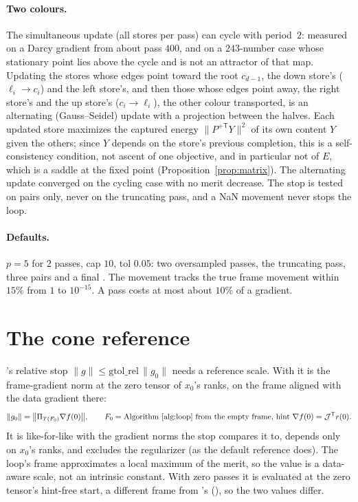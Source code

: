 \documentclass[11pt]{article}
\newcommand{\T}{\mathsf{T}}
\newcommand{\Jac}{\mathcal{J}}
\theoremstyle{definition}
\theoremstyle{plain}
\begin{document}
\paragraph{Two colours.} The simultaneous update (all stores per pass) can cycle with period~$2$: measured on a Darcy
gradient from about pass $400$, and on a $243$-number case whose stationary point lies above the cycle and is not an
attractor of that map. Updating the stores whose edges point toward the root $c_{d-1}$, the down store's
($\ell_i\to c_i$) and the left store's, and then those whose edges point away, the right store's and the up store's
($c_i\to\ell_i$), the other colour transported, is an alternating (Gauss--Seidel) update with a projection between the
halves. Each updated store maximizes the captured energy $\|P^{+\T}Y\|^2$ of its own content $Y$ given the others;
since $Y$ depends on the store's previous completion, this is a self-consistency condition, not ascent of one
objective, and in particular not of $E$, which is a saddle at the fixed point (Proposition~\ref{prop:matrix}). The
alternating update converged on the cycling case with no merit decrease. The stop is tested on pairs only, never on the truncating pass,
and a NaN movement never stops the loop.

\paragraph{Defaults.} $p=5$ for $2$ passes, cap $10$, tol $0.05$: two oversampled passes, the truncating pass, three
pairs and a final . The movement tracks the true frame movement within $15\%$ from $1$ to $10^{-15}$.
A pass costs at most about $10\%$ of a gradient.

\section{The cone reference}\label{sec:cone}

's relative stop $\|g\|\le\mathrm{gtol\_rel}\,\|g_0\|$ needs a reference scale. With
 it is the frame-gradient norm at the zero tensor of $x_0$'s ranks, on the frame aligned
with the data gradient there:
\begin{equation}
  \|g_0\| = \bigl\|\Pi_{T(F_0)}\nabla f(0)\bigr\|,\qquad F_0=\text{Algorithm~\ref{alg:loop} from the empty frame,
  hint } \nabla f(0)=\Jac^\T r(0).
\end{equation}
It is like-for-like with the gradient norms the stop compares it to, depends only on $x_0$'s ranks, and excludes the
regularizer (as the default  reference does). The loop's frame approximates a local maximum of the merit, so the
value is a data-aware scale, not an intrinsic constant. With zero passes it is evaluated at the zero tensor's
hint-free start, a different frame from 's (), so the two values differ.
\end{document}

